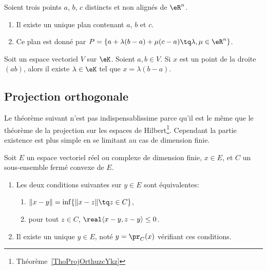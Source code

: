 \begin{proposition}	\label{PROPooTVSZooOJTnnn}
	Soient trois points \( a\), \( b\), \( c\) distincts et non alignés de \( \eR^n\).
	\begin{enumerate}
		\item
		      Il existe un unique plan contenant \( a\), \( b\) et \( c\).
		\item
		      Ce plan est donné par \( P=\{ a+\lambda(b-a)+\mu(c-a)\tq \lambda,\mu\in \eR^n \}\).
	\end{enumerate}
\end{proposition}

\begin{proposition}	\label{PROPooUDLRooShTGmV}
	Soit un espace vectoriel \( V\) sur \( \eK\). Soient \( a,b\in V\). Si \( x\) est un point de la droite \( (ab)\), alors il existe \( \lambda\in \eK\) tel que \( x=\lambda(b-a)\).
\end{proposition}


\subsection{Projection orthogonale}

Le théorème suivant n'est pas indispensablissime parce qu'il est le même que le théorème de la projection sur les espaces de Hilbert\footnote{Théorème~\ref{ThoProjOrthuzcYkz}}. Cependant la partie existence est plus simple en se limitant au cas de dimension finie.
\begin{theoremDef}  \label{ThoWKwosrH}
	Soit \( E\) un espace vectoriel réel ou complexe de dimension finie, \( x\in E\), et \( C\) un sous-ensemble fermé convexe de \(E\).
	\begin{enumerate}
		\item
		      Les deux conditions suivantes sur \( y\in E\) sont équivalentes:
		      \begin{enumerate}
			      \item   \label{zzETsfYCSItemi}
			            \( \| x-y \|=\inf\{ \| x-z \|\tq z\in C \}\),
			      \item\label{zzETsfYCSItemii}
			            pour tout \( z\in C\), \( \real\langle x-y, z-y\rangle \leq 0\).
		      \end{enumerate}
		\item
		      Il existe un unique \( y\in E\), noté \( y=\pr_C(x)\) vérifiant ces conditions.
	\end{enumerate}
\end{theoremDef}

